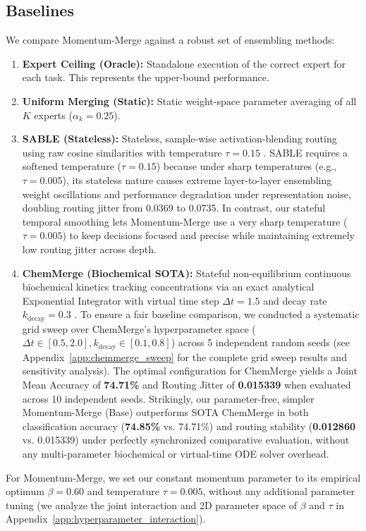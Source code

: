 \subsection{Baselines}
We compare Momentum-Merge against a robust set of ensembling methods:
\begin{enumerate}
    \item \textbf{Expert Ceiling (Oracle):} Standalone execution of the correct expert for each task. This represents the upper-bound performance.
    \item \textbf{Uniform Merging (Static):} Static weight-space parameter averaging of all $K$ experts ($\alpha_k = 0.25$).
    \item \textbf{SABLE (Stateless):} Stateless, sample-wise activation-blending routing using raw cosine similarities with temperature $\tau = 0.15$ \cite{sable}. SABLE requires a softened temperature ($\tau = 0.15$) because under sharp temperatures (e.g., $\tau = 0.005$), its stateless nature causes extreme layer-to-layer ensembling weight oscillations and performance degradation under representation noise, doubling routing jitter from 0.0369 to 0.0735. In contrast, our stateful temporal smoothing lets Momentum-Merge use a very sharp temperature ($\tau = 0.005$) to keep decisions focused and precise while maintaining extremely low routing jitter across depth.
    \item \textbf{ChemMerge (Biochemical SOTA):} Stateful non-equilibrium continuous biochemical kinetics tracking concentrations via an exact analytical Exponential Integrator with virtual time step $\Delta t = 1.5$ and decay rate $k_{\text{decay}} = 0.3$ \cite{chemmerge}. To ensure a fair baseline comparison, we conducted a systematic grid sweep over ChemMerge's hyperparameter space ($\Delta t \in [0.5, 2.0], k_{\text{decay}} \in [0.1, 0.8]$) across 5 independent random seeds (see Appendix~\ref{app:chemmerge_sweep} for the complete grid sweep results and sensitivity analysis). The optimal configuration for ChemMerge yields a Joint Mean Accuracy of \textbf{74.71\%} and Routing Jitter of \textbf{0.015339} when evaluated across 10 independent seeds. Strikingly, our parameter-free, simpler Momentum-Merge (Base) outperforms SOTA ChemMerge in both classification accuracy (\textbf{74.85\%} vs. 74.71\%) and routing stability (\textbf{0.012860} vs. 0.015339) under perfectly synchronized comparative evaluation, without any multi-parameter biochemical or virtual-time ODE solver overhead.
\end{enumerate}
For Momentum-Merge, we set our constant momentum parameter to its empirical optimum $\beta = 0.60$ and temperature $\tau = 0.005$, without any additional parameter tuning (we analyze the joint interaction and 2D parameter space of $\beta$ and $\tau$ in Appendix~\ref{app:hyperparameter_interaction}).

